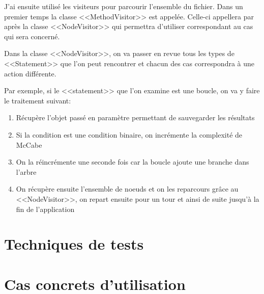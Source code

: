 \documentclass[a4paper, 11pt]{article}
\begin{document}
	J'ai ensuite utilisé les visiteurs pour parcourir l'ensemble du fichier. Dans un premier temps la classe <<MethodVisitor>> est appelée.  Celle-ci appellera par après la classe <<NodeVisitor>> qui permettra d'utiliser correspondant au cas qui sera concerné.
	
	
	Dans la classe <<NodeVisitor>>, on va passer en revue tous les types de <<Statement>> que l'on peut rencontrer et chacun des cas correspondra à une action différente.
	
	
	Par exemple, si le <<statement>> que l'on examine est une boucle, on va y faire le traitement suivant:
	\begin{enumerate}
		\item Récupère l'objet passé en paramètre permettant de sauvegarder les résultats
		\item Si la condition est une condition binaire, on incrémente la complexité de McCabe
		\item On la réincrémente une seconde fois car la boucle ajoute une branche dans l'arbre
		\item On récupère ensuite l'ensemble de noeuds et on les reparcours grâce au <<NodeVisitor>>, on repart ensuite pour un tour et ainsi de suite jusqu'à la fin de l'application
	\end{enumerate}
	
	
\section{Techniques de tests}

\section{Cas concrets d'utilisation}
\end{document}
